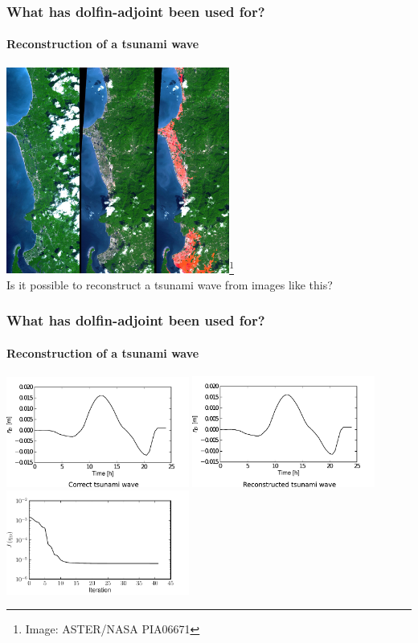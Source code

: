 \frame
{
  \frametitle{What has dolfin-adjoint been used for?}
  \framesubtitle{Reconstruction of a tsunami wave}
        \begin{center}
        \includegraphics[width=0.55\textwidth]{jpg/PIA06671}\footnote{Image: ASTER/NASA PIA06671} \\
        Is it possible to reconstruct a tsunami wave from images like this?
        \end{center}
}

\frame
{
  \frametitle{What has dolfin-adjoint been used for?}
  \framesubtitle{Reconstruction of a tsunami wave}
        \begin{center}
        \includegraphics[width=0.45\textwidth]{pdf/controls_optimal}
        \includegraphics[width=0.45\textwidth]{pdf/controls_47} \\
        \includegraphics[width=0.45\textwidth]{pdf/wetdry_iter_plot} \\
        \end{center}
}

